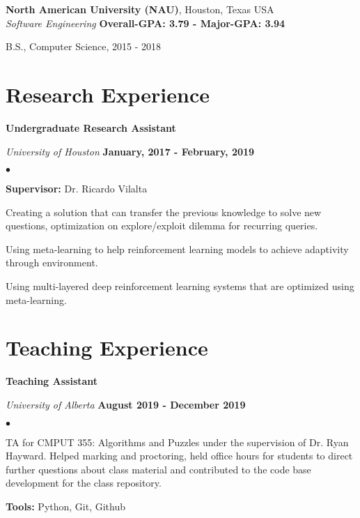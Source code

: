 \documentclass[margin,line]{res}
\newenvironment{list1}{
  \begin{list}{\ding{113}}{%
      \setlength{\itemsep}{0in}
      \setlength{\parsep}{0in} \setlength{\parskip}{0in}
      \setlength{\topsep}{0in} \setlength{\partopsep}{0in} 
      \setlength{\leftmargin}{0.17in}}}{\end{list}}
\newenvironment{list2}{
  \begin{list}{$\bullet$}{%
      \setlength{\itemsep}{0in}
      \setlength{\parsep}{0in} \setlength{\parskip}{0in}
      \setlength{\topsep}{0in} \setlength{\partopsep}{0in} 
      \setlength{\leftmargin}{0.2in}}}{\end{list}}
\begin{document}
\begin{resume}
{\bf North American University (NAU)}, Houston, Texas USA\\
{\em Software Engineering}  \hfill {\bf Overall-GPA: 3.79 - Major-GPA: 3.94}\\
\vspace{-.3cm}
\begin{list1}
\item[] B.S., Computer Science,  2015 - 2018
\end{list1}


\section{\sc Research Experience}

{\bf Undergraduate Research Assistant}

\vspace{-.3cm}
{\em University of Houston} \hfill {\bf January, 2017 - February, 2019}\\ 
\vspace{-.3cm}
\begin{list2}
\item \textbf{Supervisor:} Dr. Ricardo Vilalta
\item Creating a solution that can transfer the previous knowledge to solve new questions, optimization on explore/exploit dilemma for recurring queries. 
\item Using meta-learning to help reinforcement learning models to achieve adaptivity through environment. 
\item Using multi-layered deep reinforcement learning systems that are optimized using meta-learning. 
\end{list2}

\section{\sc Teaching Experience}
{\bf Teaching Assistant}

\vspace{-.3cm}
{\em University of Alberta} \hfill {\bf August 2019 - December 2019}\\
\begin{list2}
	\item TA for CMPUT 355: Algorithms and Puzzles under the supervision of Dr. Ryan Hayward. Helped marking and proctoring, held office hours for students to direct further questions about class material and contributed to the code base development for the class repository.
	\item \textbf{Tools:} Python, Git, Github
\end{list2}
\vspace*{.05in}


\end{resume}
\end{document}
